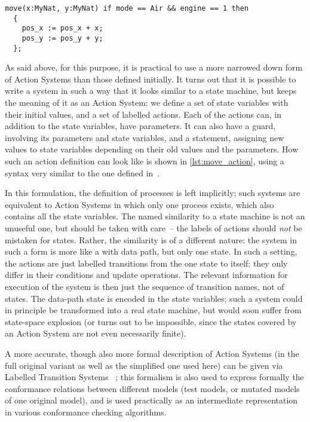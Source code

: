 \begin{lstlisting}[style=floating, label=lst:move_action, language={},
  caption={Description of an action \lstinline|move| in a concrete syntax. The action has two
    parameters, a guard, and a statement consisting of two sub-statements. \lstinline|mode|,
    \lstinline|engine|, \lstinline|pos_x| and \lstinline|pos_y| are (global) state variables.}]
  move(x:MyNat, y:MyNat) if mode == Air && engine == 1 then
  {
    pos_x := pos_x + x;
    pos_y := pos_y + y;
  };
\end{lstlisting}

As said above, for this purpose, it is practical to use a more narrowed down form of Action Systems
than those defined initially. It turns out that it is possible to write a system in such a way that
it looks similar to a state machine, but keeps the meaning of it as an Action System: we define a
set of state variables with their initial values, and a set of labelled actions. Each of the actions
can, in addition to the state variables, have parameters. It can also have a guard, involving its
parameters and state variables, and a statement, assigning new values to state variables depending
on their old values and the parameters. How such an action definition can look like is shown in
\autoref{lst:move_action}, using a syntax very similar to the one defined in~\cite[p.~16]{tappler2015:symbolic}.

In this formulation, the definition of processes is left implicitly; such systems are equivalent to
Action Systems in which only one process exists, which also contains all the state variables. The
named similarity to a state machine is not an unuseful one, but should be taken with care~-- the
labels of actions should \emph{not} be mistaken for states. Rather, the similarity is of a different
nature: the system in such a form is more like a  with data path, but only one state. In
such a setting, the actions are just labelled transitions from the one state to itself; they only
differ in their conditions and update operations. The relevant information for execution of the
system is then just the sequence of transition names, not of states. The data-path state is encoded
in the state variables; such a system could in principle be transformed into a real state machine,
but would soon suffer from state-space explosion (or turns out to be impossible, since the states
covered by an Action System are not even necessarily finite). 

A more accurate, though also more formal description of Action Systems (in the full original variant
as well as the simplified one used here) can be given via Labelled Transition Systems
~\cites[p.~11]{tappler2015:symbolic}[p.~21]{jobstl2014:model-based}; this formalism is also used to express formally the conformance
relations between different models (test models, or mutated models of one original model), and is
used practically as an intermediate representation in various conformance checking algorithms.

